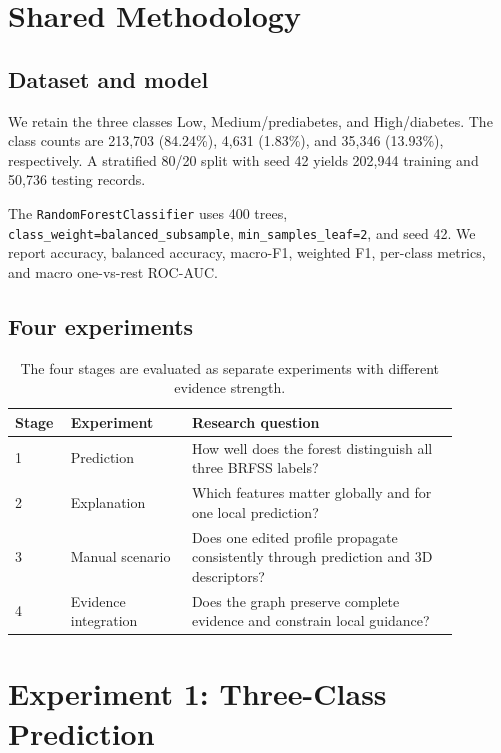 \documentclass[11pt]{article}
\begin{document}
\section{Shared Methodology}

\subsection{Dataset and model}

We retain the three classes Low, Medium/prediabetes, and High/diabetes. The class counts are 213,703 (84.24\%), 4,631 (1.83\%), and 35,346 (13.93\%), respectively. A stratified 80/20 split with seed 42 yields 202,944 training and 50,736 testing records.

The \texttt{RandomForestClassifier} uses 400 trees, \texttt{class\_weight=balanced\_subsample}, \texttt{min\_samples\_leaf=2}, and seed 42. We report accuracy, balanced accuracy, macro-F1, weighted F1, per-class metrics, and macro one-vs-rest ROC-AUC.

\subsection{Four experiments}

\begin{table}[t]
\centering
\caption{The four stages are evaluated as separate experiments with different evidence strength.}
\label{tab:experiments}
\begin{tabular}{p{0.08\linewidth}p{0.25\linewidth}p{0.55\linewidth}}
\toprule
Stage & Experiment & Research question \\
\midrule
1 & Prediction & How well does the forest distinguish all three BRFSS labels? \\
2 & Explanation & Which features matter globally and for one local prediction? \\
3 & Manual scenario & Does one edited profile propagate consistently through prediction and 3D descriptors? \\
4 & Evidence integration & Does the graph preserve complete evidence and constrain local guidance? \\
\bottomrule
\end{tabular}
\end{table}

\section{Experiment 1: Three-Class Prediction}
\end{document}
